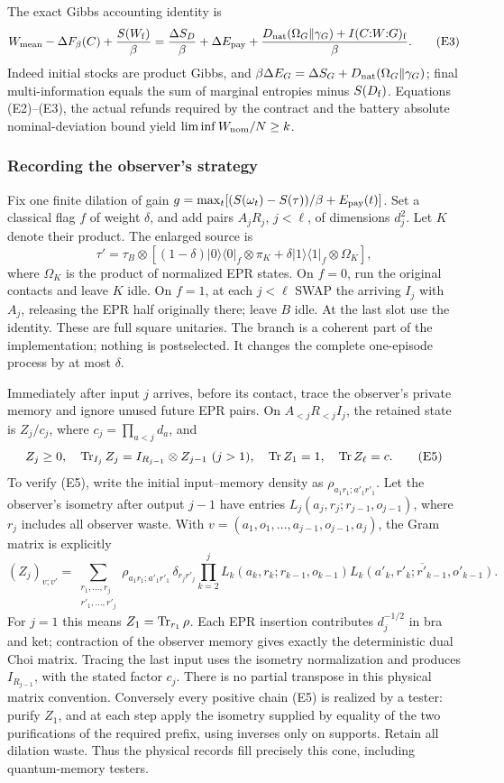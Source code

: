 The exact Gibbs accounting identity is
\[
 W_{\rm mean}-\Delta F_\beta(C)+\frac{S(W_{\rm f})}{\beta}
 =\frac{\Delta S_D}{\beta}+\Delta E_{\rm pay}
  +\frac{D_{\mathrm{nat}}(\Omega_G\|\gamma_G)+I(C{:}W{:}G)_{\rm f}}{\beta}. \tag{E3}
\]
Indeed initial stocks are product Gibbs, and
\(\beta\Delta E_G=\Delta S_G+D_{\mathrm{nat}}(\Omega_G\|\gamma_G)\);
final multi-information equals the sum of marginal entropies minus
\(S(D_{\rm f})\). Equations (E2)--(E3), the actual refunds required by the contract and the
battery absolute nominal-deviation bound yield
\(\liminf W_{\rm nom}/N\ge k\).

\subsubsection{Recording the observer's strategy}
Fix one finite dilation of gain
\(g=\max_t[(S(\omega_t)-S(\tau))/\beta+E_{\rm pay}(t)]\).
Set a classical flag \(f\) of weight \(\delta\), and add pairs
\(A_jR_j\), \(j<\ell\), of dimensions \(d_j^2\). Let \(K\) denote their
product. The enlarged source is
\[
 \tau'=\tau_B\otimes
 [(1-\delta)|0\rangle\langle0|_f\otimes\pi_K
   +\delta|1\rangle\langle1|_f\otimes\Omega_K],        \tag{E4}
\]
where \(\Omega_K\) is the product of normalized EPR states.
On \(f=0\), run the original contacts and leave \(K\) idle.
On \(f=1\), at each \(j<\ell\) SWAP the arriving \(I_j\) with \(A_j\),
releasing the EPR half originally there; leave \(B\) idle. At the last
slot use the identity. These are full square unitaries.
The branch is a coherent part of the implementation; nothing is
postselected. It changes the complete one-episode process by at most
\(\delta\).

Immediately after input \(j\) arrives, before its contact, trace the
observer's private memory and ignore unused future EPR pairs.
On \(A_{<j}R_{<j}I_j\), the retained
state is \(Z_j/c_j\), where \(c_j=\prod_{a<j}d_a\), and
\[
 Z_j\ge0,\quad
 \operatorname{Tr}_{I_j}Z_j=I_{R_{j-1}}\otimes Z_{j-1}\ (j>1),
 \quad \operatorname{Tr} Z_1=1,\quad \operatorname{Tr} Z_\ell=c.                 \tag{E5}
\]
To verify (E5), write the initial input--memory density as
\(\rho_{a_1r_1;a'_1r'_1}\). Let the observer's isometry after
output \(j-1\) have entries
\(L_j(a_j,r_j;r_{j-1},o_{j-1})\), where \(r_j\) includes all
observer waste. With \(v=(a_1,o_1,\ldots,a_{j-1},o_{j-1},a_j)\),
the Gram matrix is explicitly
\[
 (Z_j)_{v;v'}=
 \sum_{\substack{r_1,\ldots,r_j\\r'_1,\ldots,r'_j}}
 \rho_{a_1r_1;a'_1r'_1}\,\delta_{r_jr'_j}
 \prod_{k=2}^j
 L_k(a_k,r_k;r_{k-1},o_{k-1})
 \overline{L_k(a'_k,r'_k;r'_{k-1},o'_{k-1})}.
 \]
For \(j=1\) this means \(Z_1=\operatorname{Tr}_{r_1}\rho\).
Each EPR insertion contributes
\(d_j^{-1/2}\) in bra and ket; contraction of the observer memory gives
exactly the deterministic dual Choi matrix. Tracing the last input
uses the isometry normalization and produces \(I_{R_{j-1}}\), with
the stated factor \(c_j\). There is no partial transpose in this
physical matrix convention. Conversely every positive chain (E5)
is realized by a tester: purify \(Z_1\), and at each step apply the
isometry supplied by equality of the two purifications of the
required prefix, using inverses only on supports. Retain all dilation
waste. Thus the physical records fill precisely this cone, including
quantum-memory testers.

